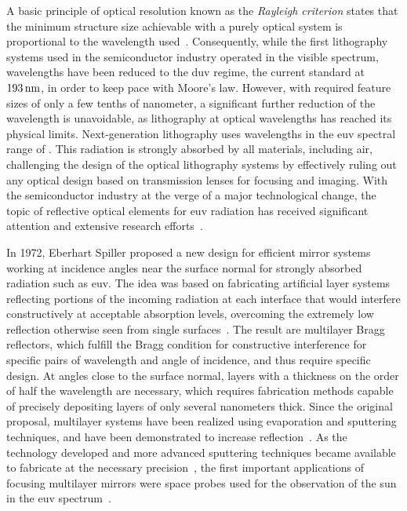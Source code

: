 A basic principle of optical resolution known as the \emph{Rayleigh criterion}
states
that the minimum structure size achievable with a purely optical system is
proportional to the wavelength used~\cite{lord_rayleigh_xxxi._1879}.
Consequently, while the first lithography systems used in the semiconductor
industry operated in the visible spectrum, wavelengths have been reduced to the
\gls{duv} regime, the current standard at $\nm{193}$, in order to keep pace with
Moore's law.
However, with required feature sizes of only a few tenths of nanometer, a
significant further reduction of the wavelength is unavoidable, as lithography
at optical wavelengths has reached its physical limits.
Next-generation lithography uses wavelengths in the \gls{euv} spectral range of
.
This radiation is strongly absorbed by all materials, including air, challenging
the design of the optical lithography systems by effectively ruling out any
optical design based on transmission lenses for focusing and imaging.
With the semiconductor industry at the verge of a major technological change,
the topic of reflective optical elements for \gls{euv} radiation has received
significant attention and extensive research efforts~\cite{bakshi_euv_2009}.

In 1972, Eberhart Spiller proposed a new design for efficient mirror systems
working at incidence angles near the surface normal for strongly absorbed
radiation such as \gls{euv}.
The idea was based on fabricating artificial layer systems reflecting portions
of the incoming radiation at each interface that would interfere constructively
at acceptable absorption levels, overcoming the extremely low reflection
otherwise seen from single surfaces~\cite{spiller_low-loss_1972}.
The result are multilayer Bragg reflectors, which fulfill the Bragg condition
for constructive interference for specific pairs of wavelength and angle of
incidence, and thus require specific design.
At angles close to the surface normal, layers with a thickness on the order of
half the wavelength are necessary, which requires fabrication methods capable of
precisely depositing layers of only several nanometers thick.
Since the original proposal, multilayer systems have been realized using
evaporation and sputtering techniques, and have been demonstrated to increase
reflection~\cite{spiller_reflective_1976, underwood_layered_1981}.
As the technology developed and more advanced sputtering techniques became
available to fabricate at the necessary
precision~\cite{stearns_fabrication_1991}, the first important applications of
focusing multilayer mirrors were space probes used for the observation of the
sun in the \gls{euv} spectrum~\cite{chauvineau_description_1992,
clette_eit:_1995, spiller_soft_1994}.

